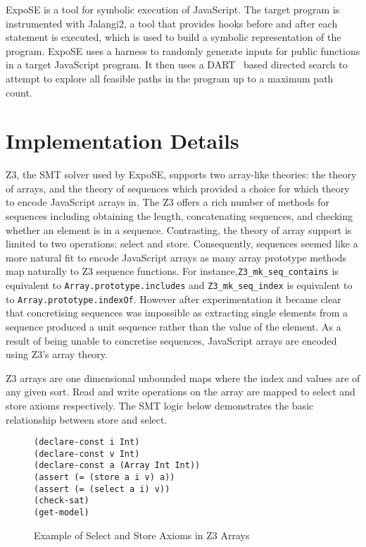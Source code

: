 \documentclass[]{final_report}
\begin{document}
ExpoSE is a tool for symbolic execution of JavaScript. The target program is instrumented with Jalangi2, a tool that provides hooks before and after each statement is executed, which is used to build a symbolic representation of the program. ExpoSE uses a harness to randomly generate inputs for public functions in a target JavaScript program. It then uses a DART~\cite{godefroid2005dart} based directed search to attempt to explore all feasible paths in the program up to a maximum path count.

\chapter{Implementation Details}
Z3, the SMT solver used by ExpoSE, supports two array-like theories: the theory of arrays, and the theory of sequences which provided a choice for which theory to encode JavaScript arrays in. The Z3 offers a rich number of methods for sequences including obtaining the length, concatenating sequences, and checking whether an element is in a sequence. Contrasting, the theory of array support is limited to two operations: select and store. Consequently, sequences seemed like a more natural fit to encode JavaScript arrays as many array prototype methods map naturally to Z3 sequence functions. For instance,\lstinline{Z3_mk_seq_contains} is equivalent to \lstinline{Array.prototype.includes} and \lstinline{Z3_mk_seq_index} is equivalent to to \lstinline{Array.prototype.indexOf}. However after experimentation it became clear that concretising sequences was impossible as extracting single elements from a sequence produced a unit sequence rather than the value of the element. As a result of being unable to concretise sequences, JavaScript arrays are encoded using Z3’s array theory.


Z3 arrays are one dimensional unbounded maps where the index and values are of any given sort. Read and write operations on the array are mapped to select and store axioms respectively. The SMT logic below demonstrates the basic relationship between store and select.

\begin{figure}[t]
\begin{verbatim}
(declare-const i Int)
(declare-const v Int)
(declare-const a (Array Int Int))
(assert (= (store a i v) a))
(assert (= (select a i) v))
(check-sat)
(get-model)
\end{verbatim}
\caption{\label{fig:z3-select-store} Example of Select and Store Axioms in Z3 Arrays}
\end{figure}
\end{document}

